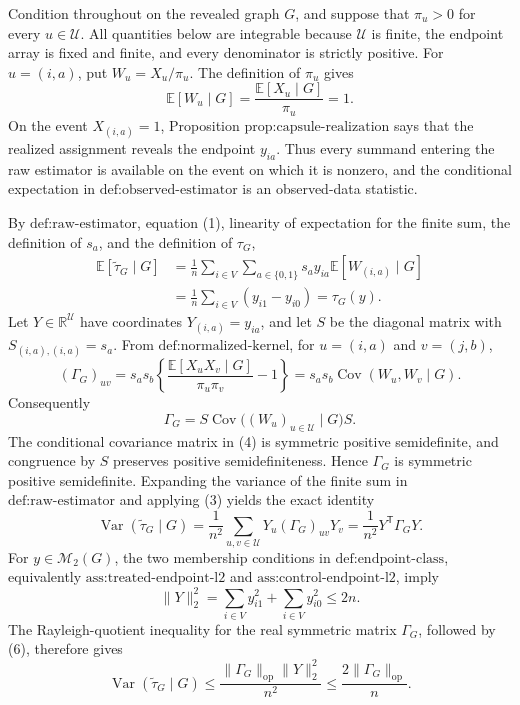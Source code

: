Condition throughout on the revealed graph \(G\), and suppose that \(\pi_u>0\) for every \(u\in\mathcal U\).  All quantities below are integrable because \(\mathcal U\) is finite, the endpoint array is fixed and finite, and every denominator is strictly positive.  For \(u=(i,a)\), put \(W_u=X_u/\pi_u\).  The definition of \(\pi_u\) gives
\[
 \mathbb E[W_u\mid G]
 =\frac{\mathbb E[X_u\mid G]}{\pi_u}=1. \tag{1}
\]
On the event \(X_{(i,a)}=1\), Proposition \(\text{prop:capsule-realization}\) says that the realized assignment reveals the endpoint \(y_{ia}\).  Thus every summand entering the raw estimator is available on the event on which it is nonzero, and the conditional expectation in \(\text{def:observed-estimator}\) is an observed-data statistic.

By \(\text{def:raw-estimator}\), equation (1), linearity of expectation for the finite sum, the definition of \(s_a\), and the definition of \(\tau_G\),
\[
\begin{aligned}
 \mathbb E[\widetilde\tau_G\mid G]
 &=\frac1n\sum_{i\in V}\sum_{a\in\{0,1\}}
       s_a y_{ia}\mathbb E[W_{(i,a)}\mid G]\\
 &=\frac1n\sum_{i\in V}(y_{i1}-y_{i0})
 =\tau_G(y). \tag{2}
\end{aligned}
\]
Let \(Y\in\mathbb R^{\mathcal U}\) have coordinates \(Y_{(i,a)}=y_{ia}\), and let \(S\) be the diagonal matrix with \(S_{(i,a),(i,a)}=s_a\).  From \(\text{def:normalized-kernel}\), for \(u=(i,a)\) and \(v=(j,b)\),
\[
 (\Gamma_G)_{uv}
 =s_as_b\left\{
 \frac{\mathbb E[X_uX_v\mid G]}{\pi_u\pi_v}-1
 \right\}
 =s_as_b\operatorname{Cov}(W_u,W_v\mid G). \tag{3}
\]
Consequently
\[
 \Gamma_G=S\operatorname{Cov}\bigl((W_u)_{u\in\mathcal U}\mid G\bigr)S. \tag{4}
\]
The conditional covariance matrix in (4) is symmetric positive semidefinite, and congruence by \(S\) preserves positive semidefiniteness.  Hence \(\Gamma_G\) is symmetric positive semidefinite.  Expanding the variance of the finite sum in \(\text{def:raw-estimator}\) and applying (3) yields the exact identity
\[
 \operatorname{Var}(\widetilde\tau_G\mid G)
 =\frac1{n^2}\sum_{u,v\in\mathcal U}Y_u(\Gamma_G)_{uv}Y_v
 =\frac1{n^2}Y^{\mathsf T}\Gamma_GY. \tag{5}
\]
For \(y\in\mathcal M_2(G)\), the two membership conditions in \(\text{def:endpoint-class}\), equivalently \(\text{ass:treated-endpoint-l2}\) and \(\text{ass:control-endpoint-l2}\), imply
\[
 \lVert Y\rVert_2^2
 =\sum_{i\in V}y_{i1}^2+\sum_{i\in V}y_{i0}^2
 \le 2n. \tag{6}
\]
The Rayleigh-quotient inequality for the real symmetric matrix \(\Gamma_G\), followed by (6), therefore gives
\[
 \operatorname{Var}(\widetilde\tau_G\mid G)
 \le \frac{\lVert\Gamma_G\rVert_{\mathrm{op}}\lVert Y\rVert_2^2}{n^2}
 \le \frac{2\lVert\Gamma_G\rVert_{\mathrm{op}}}{n}. \tag{7}
\]

